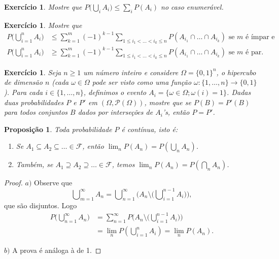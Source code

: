 \documentclass[reqno, draft]{book}
\newcommand*\1{\mathds{1}}
\newtheorem{proposition}[theorem]{Proposição}
\newtheorem{exercise}[example]{Exercício}
\DeclareMathOperator*{\mcup}{{\textstyle \bigcup}}
\DeclareMathOperator*{\mcap}{{\textstyle \bigcap}}
\begin{document}
\begin{exercise}
  Mostre que $P\big(\mcup\nolimits_i A_i\big) \leq \sum_i P(A_i)$ no caso enumerável.
\end{exercise}

\begin{exercise}
  Mostre que
  \begin{equation*}
    \begin{split}
      P\big( \mcup\nolimits_{i=1}^n A_i \big) & \leq \sum\limits_{k = 1}^m (-1)^{k-1} \sum\limits_{1 \leq i_1 < \dots < i_k \leq n} P(A_{i_1} \cap \dots \cap A_{i_k}) \text{ se $m$ é ímpar e}\\
      P\big( \mcup\nolimits_{i=1}^n A_i \big) & \geq \sum\limits_{k = 1}^m (-1)^{k-1} \sum\limits_{1 \leq i_1 < \dots < i_k \leq n} P(A_{i_1} \cap \dots \cap A_{i_k}) \text{ se $m$ é par.}
    \end{split}
  \end{equation*}
\end{exercise}



\begin{exercise}
  Seja $n \geq 1$ um número inteiro e considere $\Omega = \{0, 1\}^n$, o hipercubo de dimensão $n$ (cada $\omega \in \Omega$ pode ser visto como uma função $\omega:\{1, \dots, n\} \to \{0,1\}$).
  Para cada $i \in \{1, \dots, n\}$, definimos o evento $A_i = \{ \omega \in \Omega; \omega(i) = 1 \}$.
  Dadas duas probabilidades $P$ e $P'$ em $(\Omega, \mathcal{P}(\Omega))$, mostre que se $P(B) = P'(B)$ para todos conjuntos $B$ dados por interseções de $A_i$'s, então $P = P'$.
\end{exercise}

\begin{proposition}
  \label{p:prob_continua}
  Toda probabilidade $P$ é contínua, isto é:
  \begin{enumerate}[\quad a)]
  \item Se $A_1 \subseteq A_2 \subseteq \dots \in \mathcal{F}$, então $\lim_n P(A_n) = P(\mcup\nolimits_n A_n)$.
  \item Também, se $A_1 \supseteq A_2 \supseteq \dots \in \mathcal{F}$, temos $\lim_n P(A_n) = P(\mcap\nolimits_n A_n)$.
  \end{enumerate}
\end{proposition}

\begin{proof}
  $a)$ Observe que
  \begin{equation}
    \mcup_{m = 1}^\infty A_n = \mcup_{n = 1}^\infty \Big( A_n \setminus \big( \mcup_{i=1}^{n-1} A_i \big) \Big),
  \end{equation}
  que são disjuntos.
  Logo
  \begin{equation}
    \begin{split}
      P\big(\mcup\nolimits_{n = 1}^\infty A_n\big) & = \sum_{n = 1}^\infty P\Big( A_n \setminus \big(\mcup\nolimits_{i=1}^{n-1} A_i \big) \Big)\\
      & = \lim_n P({\mcup\nolimits_{i = 1}^n} A_i) = \lim_n P(A_n).
    \end{split}
  \end{equation}

  $b)$ A prova é análoga à de 1.
\end{proof}
\end{document}
